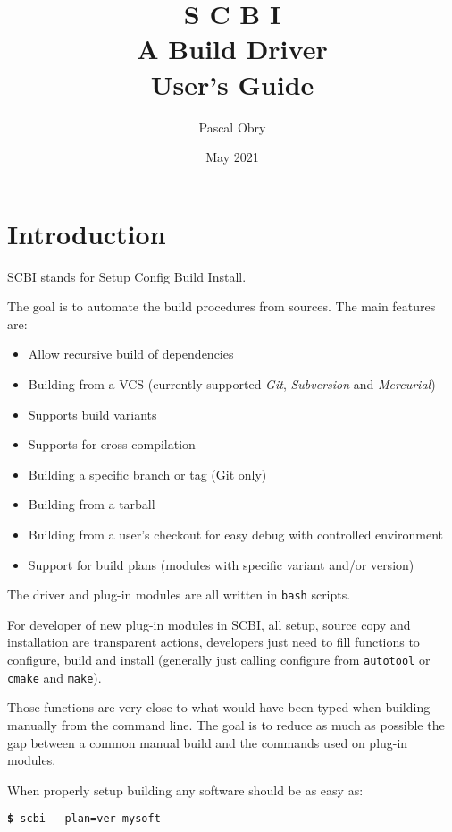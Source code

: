 \documentclass[a4paper,12pt,twoside]{article}
\title{{\Huge S C B I} \\
	{\large  A Build Driver \version} \\
	User's Guide}
\author{Pascal Obry}
\date{May 2021}
\newcommand{\code}[1]{\texttt{#1}}
\renewcommand{\emph}[1]{\textit{#1}}
\newcommand{\cmd}[1]{\tabto{1cm}\hspace{0.5cm}\texttt{\textbf{\$} #1}}
\let\stdsection\section
\renewcommand\section{\newpage\stdsection}
\newcommand{\ddash}{-{}-}
\begin{document}
\maketitle

%

\tableofcontents


\section{Introduction}

SCBI stands for Setup Config Build Install.

The goal is to automate the build procedures from sources. The main features are:

\begin{itemize}
	\item Allow recursive build of dependencies
	\item Building from a VCS (currently supported \emph{Git}, \emph{Subversion} and \emph{Mercurial})
	\item Supports build variants
	\item Supports for cross compilation
	\item Building a specific branch or tag (Git only)
	\item Building from a tarball
	\item Building from a user's checkout for easy debug with controlled environment
	\item Support for build plans (modules with specific variant and/or version)
\end{itemize}

The driver and plug-in modules are all written in \code{bash} scripts.

For developer of new plug-in modules in SCBI, all setup, source copy and installation are transparent actions, developers just need to fill functions to configure, build and install (generally just calling configure from \code{autotool} or \code{cmake} and \code{make}).

Those functions are very close to what would have been typed when building manually from the command line. The goal is to reduce as much as possible the gap between a common manual build and the commands used on plug-in modules.

When properly setup building any software should be as easy as:

\cmd{scbi \ddash{}plan=ver mysoft}
\end{document}
